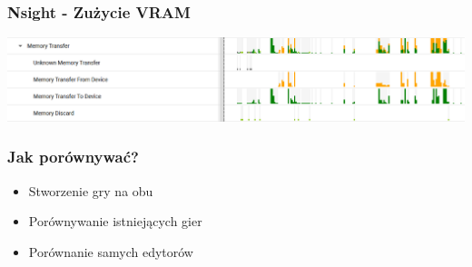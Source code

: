 \documentclass{beamer}
\begin{document}
          \begin{frame}
            \frametitle{Nsight - Zużycie VRAM}
            \center
              \includegraphics[width=1\textwidth]{memory_utilization_memory_transfer.png}
              \end{frame}

        \begin{frame}
        \frametitle{Jak porównywać?}
        \begin{itemize}
          \item Stworzenie gry na obu
          \item Porównywanie istniejących gier 
          \item Porównanie samych edytorów 
        \end{itemize} 
        \end{frame}

        {
          \begin{frame}
          \end{frame}
          }
\end{document}
